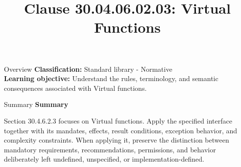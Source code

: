 \documentclass[10pt,letterpaper]{article}
\title{Clause 30.04.06.02.03: Virtual Functions}
\author{}
\date{}
\begin{document}
\maketitle
\begin{CornellOverviewBox}{Overview}
\textbf{Classification:} Standard library - Normative\\[2pt]
\textbf{Learning objective:} Understand the rules, terminology, and semantic consequences associated with Virtual functions.
\end{CornellOverviewBox}\begin{CornellSummaryBox}{Summary}
{\sffamily\bfseries\color{Accent} Summary}\par\vspace{3pt}Section 30.4.6.2.3 focuses on Virtual functions. Apply the specified interface together with its mandates, effects, result conditions, exception behavior, and complexity constraints. When applying it, preserve the distinction between mandatory requirements, recommendations, permissions, and behavior deliberately left undefined, unspecified, or implementation-defined.
\end{CornellSummaryBox}
\end{document}
